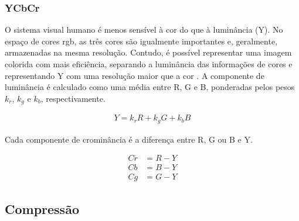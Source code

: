 \subsubsection{YCbCr}

O sistema visual humano é menos sensível à cor do que à luminância (Y). No espaço de cores \acrshort{rgb}, as três cores são igualmente importantes e, geralmente, armazenadas na mesma resolução. Contudo, é possível representar uma imagem colorida com mais eficiência, separando a luminância das informações de cores e representando Y com uma resolução maior que a cor \cite{richardson2010h}. A componente de luminância é calculado como uma média entre R, G e B, ponderadas pelos pesos $k_r$, $k_g$ e $k_b$, respectivamente.

\begin{equation}
\begin{aligned}
Y = k_rR + k_gG + k_bB 
\end{aligned}
\end{equation}

Cada componente de crominância é a diferença entre R, G ou B e Y.

\begin{equation}
\begin{aligned}
Cr &= R - Y \\
Cb &= B - Y \\
Cg &= G - Y
\end{aligned}
\end{equation}






\subsection{Compressão}


